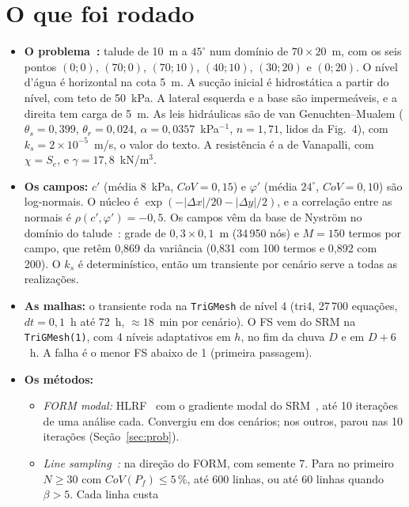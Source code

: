 \documentclass[11pt,a4paper]{article}
\begin{document}
\section{O que foi rodado}\label{sec:rodado}
\begin{itemize}
  \item \textbf{O problema~\cite{hu2024}:} talude de 10~m a $45^\circ$ num domínio de $70 \times 20$~m, com os seis
    pontos $(0;0)$, $(70;0)$, $(70;10)$, $(40;10)$, $(30;20)$ e $(0;20)$. O nível d'água é horizontal na cota 5~m. A
    sucção inicial é hidrostática a partir do nível, com teto de 50~kPa. A lateral esquerda e a base são impermeáveis,
    e a direita tem carga de 5~m. As leis hidráulicas são de van Genuchten--Mualem ($\theta_s = 0{,}399$,
    $\theta_r = 0{,}024$, $\alpha = 0{,}0357$~kPa$^{-1}$, $n = 1{,}71$, lidos da Fig.~4), com $k_s = 2 \times
    10^{-5}$~m/s, o valor do texto. A resistência é a de Vanapalli, com $\chi = S_e$, e $\gamma = 17{,}8$~kN/m$^3$.
  \item \textbf{Os campos:} $c'$ (média 8~kPa, $CoV = 0{,}15$) e $\varphi'$ (média $24^\circ$, $CoV = 0{,}10$) são
    log-normais. O núcleo é $\exp(-|\Delta x|/20 - |\Delta y|/2)$, e a correlação entre as normais é
    $\rho(c', \varphi') = -0{,}5$. Os campos vêm da base de Nyström no domínio do talude~\cite{formulacao}: grade de
    $0{,}3 \times 0{,}1$~m (34\,950 nós) e $M = 150$ termos por campo, que retêm 0,869 da variância (0,831 com 100
    termos e 0,892 com 200). O $k_s$ é determinístico, então um transiente por cenário serve a todas as realizações.
  \item \textbf{As malhas:} o transiente roda na \texttt{TriGMesh} de nível 4 (tri4, 27\,700 equações, $dt = 0{,}1$~h
    até 72~h, $\approx 18$~min por cenário). O FS vem do SRM na \texttt{TriGMesh(1)}, com 4 níveis adaptativos em $h$,
    no fim da chuva $D$ e em $D + 6$~h. A falha é o menor FS abaixo de 1 (primeira passagem).
  \item \textbf{Os métodos:}
    \begin{itemize}
      \item \emph{FORM modal:} HLRF~\cite{hasofer1974,rackwitz1978} com o gradiente modal do SRM~\cite{formulacao},
        até 10 iterações de uma análise cada. Convergiu em \nFormConv{} dos \nCasos{} cenários; nos outros, parou nas
        10 iterações (Seção~\ref{sec:prob}).
      \item \emph{Line sampling~\cite{koutsourelakis2004}:} na direção do FORM, com semente 7. Para no primeiro
        $N \ge 30$ com $CoV(P_f) \le 5\,\%$, até 600 linhas, ou até 60 linhas quando $\beta > 5$. Cada linha custa

\end{itemize}
\end{itemize}
\end{document}
